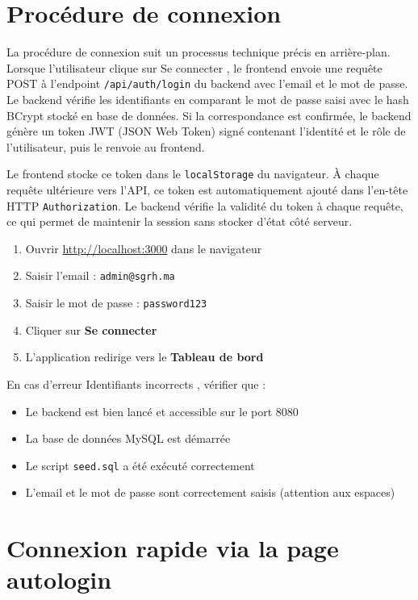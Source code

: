 \documentclass[12pt,a4paper]{report}
\begin{document}
\section{Procédure de connexion}

La procédure de connexion suit un processus technique précis en arrière-plan. Lorsque l'utilisateur clique sur \og Se connecter \fg{}, le frontend envoie une requête POST à l'endpoint \texttt{/api/auth/login} du backend avec l'email et le mot de passe. Le backend vérifie les identifiants en comparant le mot de passe saisi avec le hash BCrypt stocké en base de données. Si la correspondance est confirmée, le backend génère un token JWT (JSON Web Token) signé contenant l'identité et le rôle de l'utilisateur, puis le renvoie au frontend.

Le frontend stocke ce token dans le \texttt{localStorage} du navigateur. À chaque requête ultérieure vers l'API, ce token est automatiquement ajouté dans l'en-tête HTTP \texttt{Authorization}. Le backend vérifie la validité du token à chaque requête, ce qui permet de maintenir la session sans stocker d'état côté serveur.

\begin{enumerate}
    \item Ouvrir \url{http://localhost:3000} dans le navigateur
    \item Saisir l'email : \texttt{admin@sgrh.ma}
    \item Saisir le mot de passe : \texttt{password123}
    \item Cliquer sur \textbf{Se connecter}
    \item L'application redirige vers le \textbf{Tableau de bord}
\end{enumerate}

En cas d'erreur \og Identifiants incorrects \fg{}, vérifier que :
\begin{itemize}
    \item Le backend est bien lancé et accessible sur le port 8080
    \item La base de données MySQL est démarrée
    \item Le script \texttt{seed.sql} a été exécuté correctement
    \item L'email et le mot de passe sont correctement saisis (attention aux espaces)
\end{itemize}

\section{Connexion rapide via la page autologin}
\end{document}
